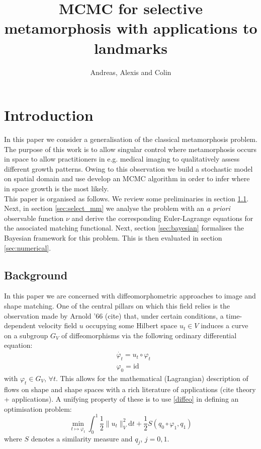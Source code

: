 \documentclass{article}
\newcommand{\half}{\frac 12}
\newcommand{\norm}[2]{\| #1 \|_{ #2 }}
\newcommand{\vnorm}[1]{\norm{ #1 }{V}}
\newcommand{\diff}[1]{\text{d} #1}
\begin{document}
\title{MCMC for selective metamorphosis with applications to landmarks}
\author{Andreas, Alexis and Colin}
\maketitle
\section{Introduction}

In this paper we consider a generalisation of the classical metamorphosis
problem. The purpose of this work is to allow singular control where
metamorphosis occurs in space to allow practitioners in e.g. medical imaging to
qualitatively assess different growth patterns. Owing to this observation we
build a stochastic model on spatial domain and use develop an MCMC algorithm in
order to infer where in space growth is the most likely.\\

This paper is organised as follows. We review some preliminaries in section
\ref{sec:bg}. Next, in section \ref{sec:select_mm} we analyse the problem with
an \emph{a priori} observable function $\nu$ and derive the corresponding
Euler-Lagrange equations for the associated matching functional. Next, section
\ref{sec:bayesian} formalises the Bayesian framework for this problem. This is
then evaluated in section \ref{sec:numerical}.

\subsection{Background}\label{sec:bg}

In this paper we are concerned with diffeomorphometric approaches to image and
shape matching. One of the central pillars on which this field relies is the
observation made by Arnold '66 (cite) that, under certain conditions, a
time-dependent velocity field $u$ occupying some Hilbert space $u_t \in V$
induces a curve on a subgroup $G_V$ of diffeomorphisms \cite{younes2010shapes}
via the following ordinary differential
equation:
\begin{subequations}\label{diffeo}
\begin{align}
& \dot{\varphi_t} = u_t \circ \varphi_t\\
& \varphi_0 = \text{id}
\end{align}
\end{subequations}
with $\varphi_t \in G_V$, $\forall t$. This allows for the mathematical
(Lagrangian) description of flows on shape and shape spaces with a rich
literature of applications (cite theory + applications). A unifying property of
these is to use \eqref{diffeo} in defining an optimisation problem:
\[
\min_{t \mapsto \varphi_t} \int_0^1 \half\vnorm{u_t}^2 \diff{t} + \half S(q_0\circ\varphi_1, q_1)
\]
where $S$ denotes a similarity measure and $q_j$, $j=0,1$.
\end{document}
